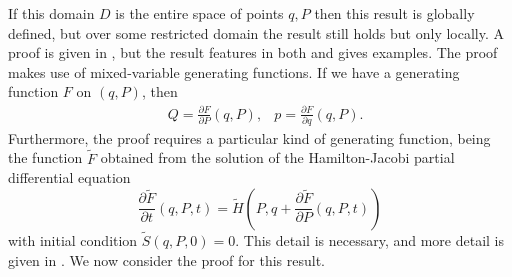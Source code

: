 \documentclass{report}
\theoremstyle{exampstyle} \newtheorem{example}[theorem]{Example}
\theoremstyle{exampstyle} \newtheorem{remark}[theorem]{Remark}
\theoremstyle{exampstyle} \newtheorem{definition}[theorem]{Definition}
\theoremstyle{exampstyle} \newtheorem{lemma}[theorem]{Lemma}
\theoremstyle{exampstyle} \newtheorem{proposition}[theorem]{Proposition}
\begin{document}
If this domain $D$ is the entire space of points $q,P$ then this result is globally defined, but over some restricted domain the result still holds but only locally.
A proof is given in \cite{gni2006}, but the result features in both and \cite{Casas_2016} gives examples.
The proof makes use of mixed-variable generating functions. If we have a generating function $F$ on $(q,P)$,
then
\begin{align*}
	&Q = \frac{\partial F}{\partial P}(q,P), &p = \frac{\partial F}{\partial q}(q,P).
\end{align*}
Furthermore, the proof requires a particular kind of generating function, being the function $\tilde{F}$ obtained from the solution of the Hamilton-Jacobi partial differential equation
\begin{equation*}
	\frac{\partial \tilde{F}}{\partial t}(q,P,t) = \tilde{H} \left(
		P, q + \frac{\partial \tilde{F}}{\partial P}(q,P,t)
	\right)
\end{equation*}
with initial condition $\tilde{S}(q,P,0) = 0$.
This detail is necessary, and more detail is given in \cite{gni2006}.
We now consider the proof for this result.
\end{document}
